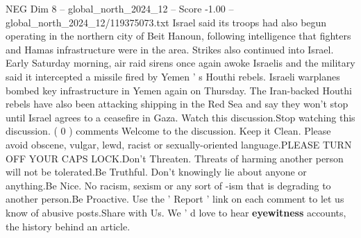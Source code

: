 \begin{textsample}{NEG Dim 8 – global\_north\_2024\_12 – Score -1.00 – global\_north\_2024\_12/119375073.txt}
Israel said its troops had also begun operating in the northern city of Beit Hanoun, following intelligence that fighters and Hamas infrastructure were in the area.
Strikes also continued into Israel.
Early Saturday morning, air raid sirens once again awoke Israelis and the military said it intercepted a missile fired by Yemen ' s Houthi rebels.
Israeli warplanes bombed key infrastructure in Yemen again on Thursday.
The Iran-backed Houthi rebels have also been attacking shipping in the Red Sea and say they won't stop until Israel agrees to a ceasefire in Gaza.
Watch this discussion.Stop watching this discussion. ( 0 ) comments Welcome to the discussion.
Keep it Clean.
Please avoid obscene, vulgar, lewd, racist or sexually-oriented language.PLEASE TURN OFF YOUR CAPS LOCK.Don't Threaten.
Threats of harming another person will not be tolerated.Be Truthful.
Don't knowingly lie about anyone or anything.Be Nice.
No racism, sexism or any sort of -ism that is degrading to another person.Be Proactive.
Use the ' Report ' link on each comment to let us know of abusive posts.Share with Us.
We ' d love to hear \textbf{eyewitness} accounts, the history behind an article.

\end{textsample}
